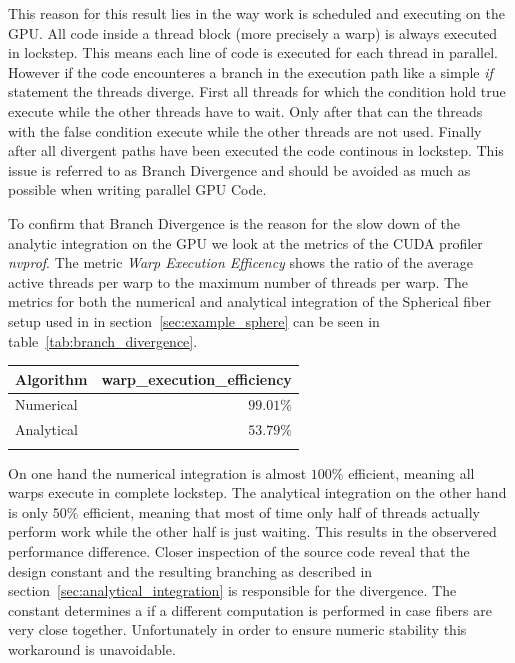 \documentclass[a4paper,11pt]{kth-mag}
\begin{document}
This reason for this result lies in the way work is scheduled and executing on the GPU. All code inside a thread block (more precisely a warp) is always executed in lockstep. This means each line of code is executed for each thread in parallel. However if the code encounteres a branch in the execution path like a simple \emph{if} statement the threads diverge. First all threads for which the condition hold true execute while the other threads have to wait. Only after that can the threads with the false condition execute while the other threads are not used. Finally after all divergent paths have been executed the code continous in lockstep. This issue is referred to as Branch Divergence and should be avoided as much as possible when writing parallel GPU Code.

To confirm that Branch Divergence is the reason for the slow down of the analytic integration on the GPU we look at the metrics of the CUDA profiler \emph{nvprof}. The metric \emph{Warp Execution Efficency} shows the ratio of the average active threads per warp to the maximum number of threads per warp. The metrics for both the numerical and analytical integration of the Spherical fiber setup used in in section~\ref{sec:example_sphere} can be seen in table~\ref{tab:branch_divergence}.

\begin{center}
  \begin{tabulary}{0.7\textwidth}{LR}
    \toprule
    Algorithm & warp\_execution\_efficiency \\
    \midrule
    Numerical & $99.01\%$ \\
    Analytical & $53.79\%$ \\
    \bottomrule
    \label{tab:branch_divergence}
  \end{tabulary}
\end{center}

On one hand the numerical integration is almost $100\%$ efficient, meaning all warps execute in complete lockstep. The analytical integration on the other hand is only $50\%$ efficient, meaning that most of time only half of threads actually perform work while the other half is just waiting. This results in the observered performance difference. Closer inspection of the source code reveal that the design constant and the resulting branching as described in section~\ref{sec:analytical_integration} is responsible for the divergence. The constant determines a if a different computation is performed in case fibers are very close together. Unfortunately in order to ensure numeric stability this workaround is unavoidable.
\end{document}
